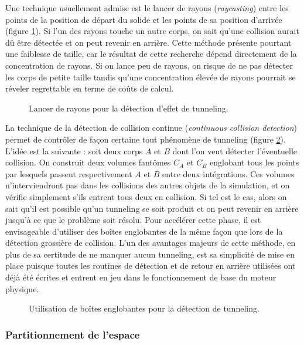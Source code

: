 Une technique usuellement admise est le lancer de rayons
(\textit{raycasting}) entre les points de la position de départ du
solide et les points de sa position d'arrivée (figure
\ref{tunneling2}). Si l'un des rayons touche un autre corps, on sait
qu'une collision aurait dû être détectée et on peut revenir en
arrière. Cette méthode présente pourtant une faiblesse de taille, car
le résultat de cette recherche dépend directement de la concentration
de rayons. Si on lance peu de rayons, on risque de ne pas détecter les
corps de petite taille tandis qu'une concentration élevée de rayons
pourrait se réveler regrettable en terme de coûts de calcul.

\begin{figure}
  \centering
  
  \caption{Lancer de rayons pour la détection d'effet de tunneling.}
  \label{tunneling2}
\end{figure}

La technique de la détection de collision continue (\textit{continuous
  collision detection}) permet de contrôler de façon certaine tout
phénomène de tunneling (figure \ref{tunneling3}). L'idée est la
suivante : soit deux corps $A$ et $B$ dont l'on veut détecter
l'éventuelle collision. On construit deux volumes fantômes $C_A$ et
$C_B$ englobant tous les points par lesquels passent respectivement
$A$ et $B$ entre deux intégrations. Ces volumes n'interviendront pas
dans les collisions des autres objets de la simulation, et on vérifie
simplement s'ils entrent tous deux en collision. Si tel est le cas,
alors on sait qu'il est possible qu'un tunneling se soit produit et on
peut revenir en arrière jusqu'à ce que le problème soit résolu. Pour
accélérer cette phase, il est envisageable d'utiliser des boîtes
englobantes de la même façon que lors de la détection grossière de
collision. L'un des avantages majeurs de cette méthode, en plus de sa
certitude de ne manquer aucun tunneling, est sa simplicité de mise en
place puisque toutes les routines de détection et de retour en arrière
utilisées ont déjà été écrites et entrent en jeu dans le
fonctionnement de base du moteur physique.

\begin{figure}[h]
  \centering
  
  \caption{Utilisation de boîtes englobantes pour la détection de tunneling.}
  \label{tunneling3}
\end{figure}

\subsubsection{Partitionnement de l'espace}

